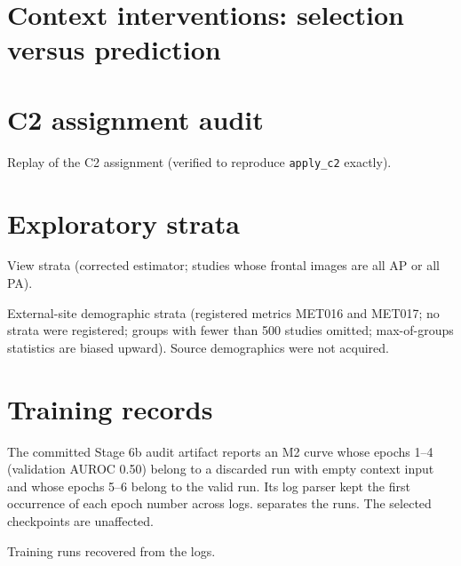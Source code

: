 \documentclass[10pt,a4paper]{article}
\begin{document}
\section{Context interventions: selection versus prediction}
\small

\normalsize

\section{C2 assignment audit}
\begin{table}[h]\centering\small
\caption{Replay of the C2 assignment (verified to reproduce \texttt{apply\_c2}
exactly).}

\end{table}

\section{Exploratory strata}
\begin{table}[h]\centering\small
\caption{View strata (corrected estimator; studies whose frontal images are
all AP or all PA).}
\begin{adjustbox}{max width=\linewidth}\end{adjustbox}
\end{table}
\begin{table}[h]\centering\small
\caption{External-site demographic strata (registered metrics MET016 and
MET017; no strata were registered; groups with fewer than 500 studies omitted;
max-of-groups statistics are biased upward). Source demographics were not
acquired.}
\begin{adjustbox}{max width=\linewidth}\end{adjustbox}
\end{table}

\section{Training records}
The committed Stage 6b audit artifact reports an M2 curve whose epochs 1--4
(validation AUROC 0.50) belong to a discarded run with empty context input and
whose epochs 5--6 belong to the valid run. Its log parser kept the first
occurrence of each epoch number across logs.  separates the
runs. The selected checkpoints are unaffected.
\begin{table}[h]\centering\small
\caption{Training runs recovered from the logs.}\label{tab:stage6}
\begin{adjustbox}{max width=\linewidth}\end{adjustbox}
\end{table}
\end{document}
